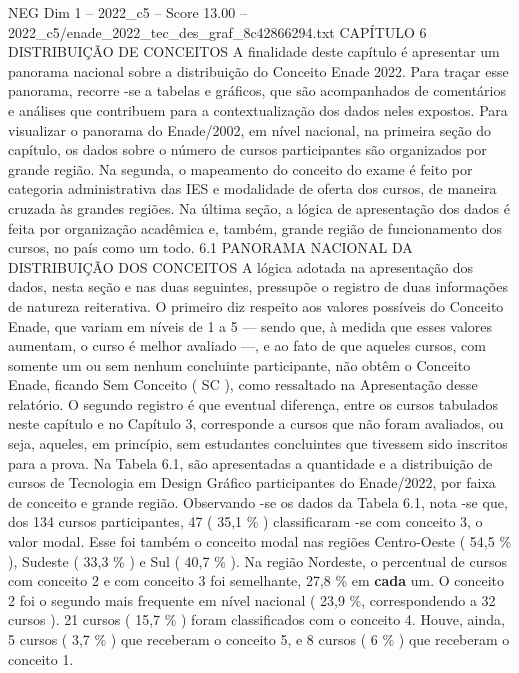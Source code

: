 \begin{textsample}{NEG Dim 1 – 2022\_c5 – Score 13.00 – 2022\_c5/enade\_2022\_tec\_des\_graf\_8c42866294.txt}  \label{ex:f1_neg_411}
CAPÍTULO 6 DISTRIBUIÇÃO DE CONCEITOS A finalidade deste capítulo é apresentar um panorama nacional sobre a distribuição do Conceito Enade 2022.
Para traçar esse panorama, recorre -se a tabelas e gráficos, que são acompanhados de comentários e análises que contribuem para a contextualização dos dados neles expostos.
Para visualizar o panorama do Enade/2002, em nível nacional, na primeira seção do capítulo, os dados sobre o número de cursos participantes são organizados por grande região.
Na segunda, o mapeamento do conceito do exame é feito por categoria administrativa das IES e modalidade de oferta dos cursos, de maneira cruzada às grandes regiões.
Na última seção, a lógica de apresentação dos dados é feita por organização acadêmica e, também, grande região de funcionamento dos cursos, no país como um todo. 6.1 PANORAMA NACIONAL DA DISTRIBUIÇÃO DOS CONCEITOS A lógica adotada na apresentação dos dados, nesta seção e nas duas seguintes, pressupõe o registro de duas informações de natureza reiterativa.
O primeiro diz respeito aos valores possíveis do Conceito Enade, que variam em níveis de 1 a 5 — sendo que, à medida que esses valores aumentam, o curso é melhor avaliado —, e ao fato de que aqueles cursos, com somente um ou sem nenhum concluinte participante, não obtêm o Conceito Enade, ficando Sem Conceito ( SC ), como ressaltado na Apresentação desse relatório.
O segundo registro é que eventual diferença, entre os cursos tabulados neste capítulo e no Capítulo 3, corresponde a cursos que não foram avaliados, ou seja, aqueles, em princípio, sem estudantes concluintes que tivessem sido inscritos para a prova.
Na Tabela 6.1, são apresentadas a quantidade e a distribuição de cursos de Tecnologia em Design Gráfico participantes do Enade/2022, por faixa de conceito e grande região.
Observando -se os dados da Tabela 6.1, nota -se que, dos 134 cursos participantes, 47 ( 35,1 \% ) classificaram -se com conceito 3, o valor modal.
Esse foi também o conceito modal nas regiões Centro-Oeste ( 54,5 \% ), Sudeste ( 33,3 \% ) e Sul ( 40,7 \% ).
Na região Nordeste, o percentual de cursos com conceito 2 e com conceito 3 foi semelhante, 27,8 \% em \textbf{cada} um.
O conceito 2 foi o segundo mais frequente em nível nacional ( 23,9 \%, correspondendo a 32 cursos ). 21 cursos ( 15,7 \% ) foram classificados com o conceito 4.
Houve, ainda, 5 cursos ( 3,7 \% ) que receberam o conceito 5, e 8 cursos ( 6 \% ) que receberam o conceito 1.

\end{textsample}
